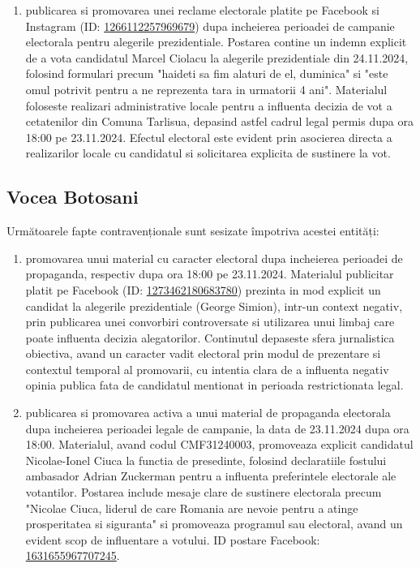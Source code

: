 \documentclass[a4paper,12pt]{article}
\begin{document}
\begin{enumerate}[leftmargin=*, label=\arabic*.)]
    \item publicarea si promovarea unei reclame electorale platite pe Facebook si Instagram (ID: \href{https://www.facebook.com/ads/library/?id=1266112257969679}{1266112257969679}) dupa incheierea perioadei de campanie electorala pentru alegerile prezidentiale. Postarea contine un indemn explicit de a vota candidatul Marcel Ciolacu la alegerile prezidentiale din 24.11.2024, folosind formulari precum "haideti sa fim alaturi de el, duminica" si "este omul potrivit pentru a ne reprezenta tara in urmatorii 4 ani". Materialul foloseste realizari administrative locale pentru a influenta decizia de vot a cetatenilor din Comuna Tarlisua, depasind astfel cadrul legal permis dupa ora 18:00 pe 23.11.2024. Efectul electoral este evident prin asocierea directa a realizarilor locale cu candidatul si solicitarea explicita de sustinere la vot.
\end{enumerate}

\vspace{0.5cm}

\subsection{Vocea Botosani}
Următoarele fapte contravenționale sunt sesizate împotriva acestei entități:

\begin{enumerate}[leftmargin=*, label=\arabic*.)]
    \item promovarea unui material cu caracter electoral dupa incheierea perioadei de propaganda, respectiv dupa ora 18:00 pe 23.11.2024. Materialul publicitar platit pe Facebook (ID: \href{https://www.facebook.com/ads/library/?id=1273462180683780}{1273462180683780}) prezinta in mod explicit un candidat la alegerile prezidentiale (George Simion), intr-un context negativ, prin publicarea unei convorbiri controversate si utilizarea unui limbaj care poate influenta decizia alegatorilor. Continutul depaseste sfera jurnalistica obiectiva, avand un caracter vadit electoral prin modul de prezentare si contextul temporal al promovarii, cu intentia clara de a influenta negativ opinia publica fata de candidatul mentionat in perioada restrictionata legal.
    \item publicarea si promovarea activa a unui material de propaganda electorala dupa incheierea perioadei legale de campanie, la data de 23.11.2024 dupa ora 18:00. Materialul, avand codul CMF31240003, promoveaza explicit candidatul Nicolae-Ionel Ciuca la functia de presedinte, folosind declaratiile fostului ambasador Adrian Zuckerman pentru a influenta preferintele electorale ale votantilor. Postarea include mesaje clare de sustinere electorala precum "Nicolae Ciuca, liderul de care Romania are nevoie pentru a atinge prosperitatea si siguranta" si promoveaza programul sau electoral, avand un evident scop de influentare a votului. ID postare Facebook: \href{https://www.facebook.com/ads/library/?id=1631655967707245}{1631655967707245}.
\end{enumerate}
\end{document}
